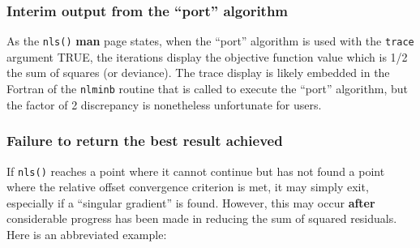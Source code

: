 \documentclass[
]{article}
\begin{document}
\hypertarget{interim-output-from-the-port-algorithm}{%
\subsubsection{Interim output from the ``port''
algorithm}\label{interim-output-from-the-port-algorithm}}

As the \texttt{nls()} \textbf{man} page states, when the ``port''
algorithm is used with the \texttt{trace} argument TRUE, the iterations
display the objective function value which is 1/2 the sum of squares (or
deviance). The trace display is likely embedded in the Fortran of the
\texttt{nlminb} routine that is called to execute the ``port''
algorithm, but the factor of 2 discrepancy is nonetheless unfortunate
for users.

\hypertarget{failure-to-return-the-best-result-achieved}{%
\subsubsection{Failure to return the best result
achieved}\label{failure-to-return-the-best-result-achieved}}

If \texttt{nls()} reaches a point where it cannot continue but has not
found a point where the relative offset convergence criterion is met, it
may simply exit, especially if a ``singular gradient'' is found.
However, this may occur \textbf{after} considerable progress has been
made in reducing the sum of squared residuals. Here is an abbreviated
example:
\end{document}
